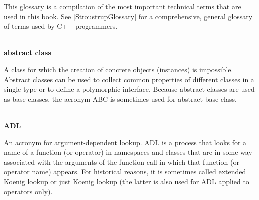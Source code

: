 
This glossary is a compilation of the most important technical terms that are used in this book. See [StroustrupGlossary] for a comprehensive, general glossary of terms used by C++ programmers.

\hspace*{\fill} \\ %
\noindent
\textbf{abstract class}

A class for which the creation of concrete objects (instances) is impossible. Abstract classes can be used to collect common properties of different classes in a single type or to define a polymorphic interface. Because abstract classes are used as base classes, the acronym ABC is sometimes used for abstract base class.

\hspace*{\fill} \\ %
\noindent
\textbf{ADL}

An acronym for argument-dependent lookup. ADL is a process that looks for a name of a function (or operator) in namespaces and classes that are in some way associated with the arguments of the function call in which that function (or operator name) appears. For historical reasons, it is sometimes called extended Koenig lookup or just Koenig lookup (the latter is also used for ADL applied to operators only).









